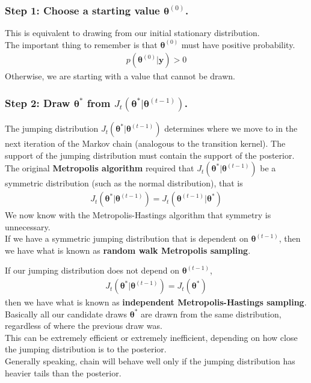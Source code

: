 \documentclass{beamer}
\begin{document}
\begin{frame}
\frametitle{Step 1: Choose a starting value $\bm{\theta}^{(0)}$.}
\pause
This is equivalent to drawing from our initial stationary distribution.\\
\bigskip
\pause
The important thing to remember is that $\bm{\theta}^{(0)}$ must have
positive probability.
\begin{eqnarray*}
p(\bm{\theta}^{(0)} | \bm{y}) > 0
\end{eqnarray*}
\bigskip
\pause
Otherwise, we are starting with a value that cannot be drawn.
\end{frame}

\begin{frame}
\frametitle{Step 2: Draw $\bm{\theta}^*$ from $J_t(\bm{\theta}^* | \bm{\theta}^{(t-1)})$.}
\pause
The jumping distribution  $J_t(\bm{\theta}^* | \bm{\theta}^{(t-1)})$
determines where we move to in the next iteration of the Markov chain
(analogous to the transition kernel).
\pause
The support of the jumping distribution must contain the support of
the posterior. \\
\pause
\bigskip
The original \textbf{Metropolis algorithm} required that
$J_t(\bm{\theta}^* | \bm{\theta}^{(t-1)})$ be a symmetric
distribution (such as the normal distribution), \pause that is
\begin{eqnarray*}
 J_t(\bm{\theta}^* | \bm{\theta}^{(t-1)}) = J_t(\bm{\theta}^{(t-1)} | \bm{\theta}^*)
\end{eqnarray*}
\pause
We now know with the Metropolis-Hastings algorithm that symmetry is
unnecessary.  \\
\bigskip
\pause
If we have a symmetric jumping distribution that is dependent on
$\bm{\theta}^{(t-1)}$, then we have what is known as \textbf{random walk Metropolis sampling}.
\end{frame}

\begin{frame}
If our jumping distribution does not depend on $\bm{\theta}^{(t-1)}$, 
\pause
\begin{eqnarray*}
J_t(\bm{\theta}^* | \bm{\theta}^{(t-1)}) = J_t(\bm{\theta}^*)
\end{eqnarray*}
\pause
then we have what is known as \textbf{independent Metropolis-Hastings sampling}.\\
\bigskip
\pause
Basically all our candidate draws $\bm{\theta}^*$ are drawn from the
same distribution, regardless of where the previous draw was.\\
\bigskip
\pause
This can be extremely efficient or extremely inefficient, depending on
how close the jumping distribution is to the posterior.\\
\bigskip
\pause
Generally speaking, chain will behave well only if the jumping
distribution has heavier tails than the posterior.
\end{frame}
\end{document}
